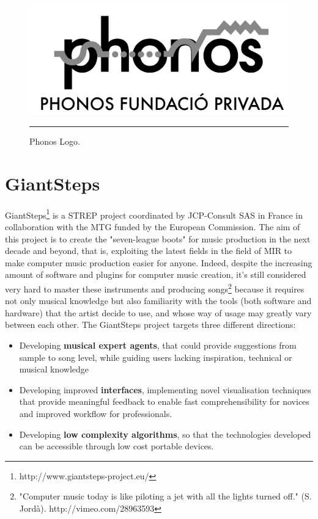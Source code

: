 \begin{figure}[htbp]
  \centering
    \includegraphics{Figures/phonos.png}
    \rule{35em}{0.5pt}
  \caption[Phonos]{Phonos Logo.}
  \label{fig:Phonos}
\end{figure}


\section{GiantSteps}
GiantSteps\footnote{http://www.giantsteps-project.eu/} is a STREP project coordinated by JCP-Consult SAS in France in collaboration with the MTG funded by the European Commission. The aim of this project is to create the "seven-league boots" for music production in the next decade and beyond, that is, exploiting the latest fields in the field of MIR to make computer music production easier for anyone. Indeed, despite the increasing amount of software and plugins for computer music creation, it's still considered very hard to master these instruments and producing songs\footnote{ "Computer music today is like piloting a jet with all the lights turned off." (S. Jordà). http://vimeo.com/28963593} because it requires not only musical knowledge but also familiarity with the tools (both software and hardware) that the artist decide to use, and whose way of usage may greatly vary between each other. The GiantSteps project targets three different directions:
\begin{itemize}
\item Developing \textbf{musical expert agents}, that could provide suggestions from sample to song level, while guiding users lacking inspiration, technical or musical knowledge
\item Developing improved \textbf{interfaces}, implementing novel visualisation techniques that provide meaningful feedback to enable fast comprehensibility for novices and improved workflow for professionals.
\item Developing \textbf{low complexity algorithms}, so that the technologies developed can be accessible through low cost portable devices. 
\end{itemize}

